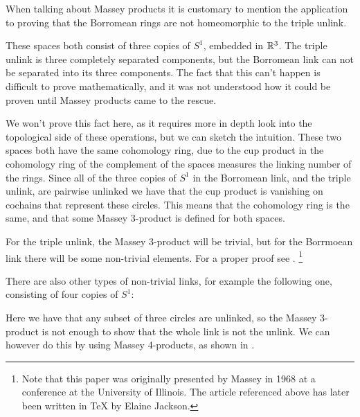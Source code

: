 \begin{example}
When talking about Massey products it is customary to mention the application to proving that the Borromean rings are not homeomorphic to the triple unlink. 

\begin{center}
\def\svgwidth{0.8\textwidth}

\end{center}

These spaces both consist of three copies of $S^1$, embedded in $\mathbb{R}^3$. The triple unlink is three completely separated components, but the Borromean link can not be separated into its three components. The fact that this can't happen is difficult to prove mathematically, and it was not understood how it could be proven until Massey products came to the rescue. 

We won't prove this fact here, as it requires more in depth look into the topological side of these operations, but we can sketch the intuition. These two spaces both have the same cohomology ring, due to the cup product in the cohomology ring of the complement of the spaces measures the linking number of the rings. Since all of the three copies of $S^1$ in the Borromean link, and the triple unlink, are pairwise unlinked we have that the cup product is vanishing on cochains that represent these circles. This means that the cohomology ring is the same, and that some Massey $3$-product is defined for both spaces. 

For the triple unlink, the Massey 3-product will be trivial, but for the Borrmoean link there will be some non-trivial elements. For a proper proof see \cite{linking}. \footnote{Note that this paper was originally presented by Massey in 1968 at a conference at the University of Illinois. The article referenced above has later been written in \TeX{} by Elaine Jackson.}
\end{example}

\begin{example}
There are also other types of non-trivial links, for example the following one, consisting of four copies of $S^1$:

\begin{center}
\def\svgwidth{0.7\textwidth}

\end{center}

Here we have that any subset of three circles are unlinked, so the Massey 3-product is not enough to show that the whole link is not the unlink. We can however do this by using Massey 4-products, as shown in \cite{four-link}. 
\end{example}



